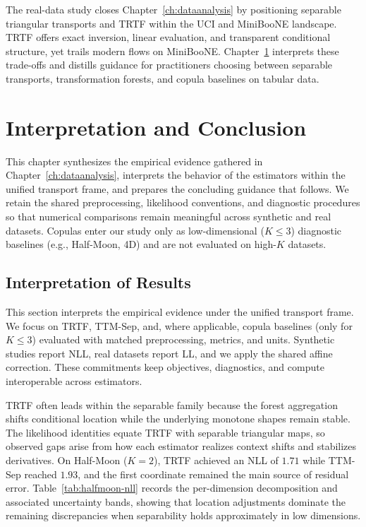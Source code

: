 \documentclass[11pt,a4paper,twoside]{book}\usepackage[]{graphicx}\usepackage[]{xcolor}
\begin{document}
 The real-data study closes Chapter~\ref{ch:dataanalysis} by positioning separable triangular transports and TRTF within the UCI and MiniBooNE landscape. TRTF offers exact inversion, linear evaluation, and transparent conditional structure, yet trails modern flows on MiniBooNE. Chapter~\ref{ch:conclusion} interprets these trade-offs and distills guidance for practitioners choosing between separable transports, transformation forests, and copula baselines on tabular data.





\chapter{Interpretation and Conclusion}\label{ch:conclusion}

This chapter synthesizes the empirical evidence gathered in Chapter~\ref{ch:dataanalysis}, interprets the behavior of the estimators within the unified transport frame, and prepares the concluding guidance that follows. We retain the shared preprocessing, likelihood conventions, and diagnostic procedures so that numerical comparisons remain meaningful across synthetic and real datasets. Copulas enter our study only as low-dimensional ($K\!\le\!3$) diagnostic baselines (e.g., Half-Moon, 4D) and are not evaluated on high-$K$ datasets.

\section{Interpretation of Results}\label{sec:interpretation-results}
This section interprets the empirical evidence under the unified transport frame. We focus on TRTF, TTM-Sep, and, where applicable, copula baselines (only for $K\!\le\!3$) evaluated with matched preprocessing, metrics, and units. Synthetic studies report NLL, real datasets report LL, and we apply the shared affine correction. These commitments keep objectives, diagnostics, and compute interoperable across estimators.

TRTF often leads within the separable family because the forest aggregation shifts conditional location while the underlying monotone shapes remain stable. The likelihood identities equate TRTF with separable triangular maps, so observed gaps arise from how each estimator realizes context shifts and stabilizes derivatives. On Half-Moon ($K=2$), TRTF achieved an NLL of $1.71$ while TTM-Sep reached $1.93$, and the first coordinate remained the main source of residual error. Table~\ref{tab:halfmoon-nll} records the per-dimension decomposition and associated uncertainty bands, showing that location adjustments dominate the remaining discrepancies when separability holds approximately in low dimensions.
\end{document}
